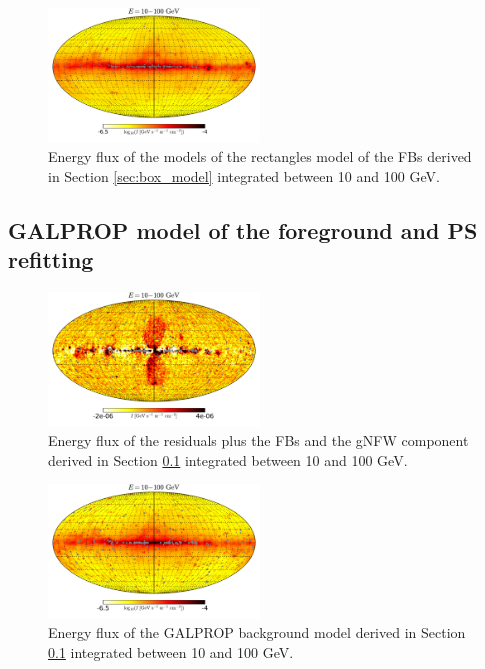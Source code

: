 \begin{figure}[h]
\centering
 \includegraphics[width=0.5\textwidth]{plots/Mollweide_Boxes_model_03-10GeV_flux_source_range_1_log.pdf}
 \caption{Energy flux of the models of the rectangles model of the FBs derived in Section \ref{sec:box_model}
 integrated between 10 and 100 GeV.}
 \label{fig:Maps_Rectangles_model}
\end{figure}

\subsection{GALPROP model of the foreground and PS refitting}
\label{sec:galprop_model}


\begin{figure}[h]
\centering
 \includegraphics[width=0.5\textwidth]{plots/Mollwiede_GALPROP_source_range2.pdf}
 \caption{Energy flux of the residuals plus the FBs and the gNFW component derived in Section \ref{sec:galprop_model}
 integrated between 10 and 100 GeV.}
 \label{fig:Maps_GALPROP}
\end{figure}

\begin{figure}[h]
\centering
 \includegraphics[width=0.5\textwidth]{plots/Mollwiede_GALPROP_model_source_range2_log.pdf}
 \caption{Energy flux of the GALPROP background model derived in Section \ref{sec:galprop_model}
 integrated between 10 and 100 GeV.}
 \label{fig:Maps_GALPROP_model}
\end{figure}

